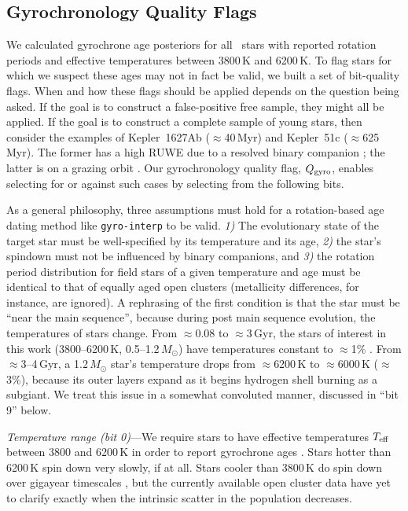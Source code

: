 \documentclass[11pt,twocolumn,tighten]{aastex63}
\begin{document}
\subsection{Gyrochronology Quality Flags}
\label{subsec:flags}
We calculated gyrochrone age posteriors for all
\nuniqstarsantosrotteffcut\ stars with reported rotation periods and
effective temperatures between 3800\,K and 6200\,K.  To flag stars for
which we suspect these ages may not in fact be valid, we built a set
of bit-quality flags.  When and how these flags should be applied
depends on the question being asked.  If the goal is to construct a
false-positive free sample, they might all be applied.  If the goal is
to construct a complete sample of young stars, then consider the
examples of Kepler~1627Ab ($\approx$40\,Myr) and Kepler~51c
($\approx$625\,Myr).  The former has a high RUWE due to a resolved
binary companion \citep{Bouma_2022a}; the latter is on a grazing orbit
\citep{2014ApJ...783...53M}.  Our gyrochronology quality flag, $Q_{\rm
gyro}$, enables selecting for or against such cases by selecting from
the following bits.

As a general philosophy, three assumptions must hold for a
rotation-based age dating method like \texttt{gyro-interp} to be
valid.  {\it 1)} The evolutionary state of the target star must be
well-specified by its temperature and its age, {\it 2)} the star's
spindown must not be influenced by binary companions, and {\it 3)} the
rotation period distribution for field stars of a given temperature
and age must be identical to that of equally aged open clusters
(metallicity differences, for instance, are ignored).  A rephrasing of
the first condition is that the star must be ``near the main
sequence'', because during post main sequence evolution, the
temperatures of stars change.  From $\approx$0.08 to $\approx$3\,Gyr,
the stars of interest in this work (3800--6200\,K,
0.5--1.2\,$M_\odot$) have temperatures constant to $\approx$1\%
\citep{Choi_2016}.  From $\approx$3--4\,Gyr, a 1.2\,$M_\odot$ star's
temperature drops from $\approx$6200\,K to $\approx$6000\,K
($\approx$3\%), because its outer layers expand as it begins hydrogen
shell burning as a subgiant.  We treat this issue in a somewhat
convoluted manner, discussed in ``bit 9'' below.

{\it Temperature range (bit 0)}---We require stars to have effective
temperatures $T_{\rm eff}$ between 3800 and 6200\,K in order to report
gyrochrone ages \citep{Bouma_2023}.   Stars hotter than 6200\,K spin
down very slowly, if at all.  Stars cooler than 3800\,K do spin down
over gigayear timescales
\citep{2016ApJ...821...93N,2023ApJ...954L..50E,2024arXiv240312129C},
but the currently available open cluster data have yet to clarify
exactly when the intrinsic scatter in the population decreases.
\end{document}
